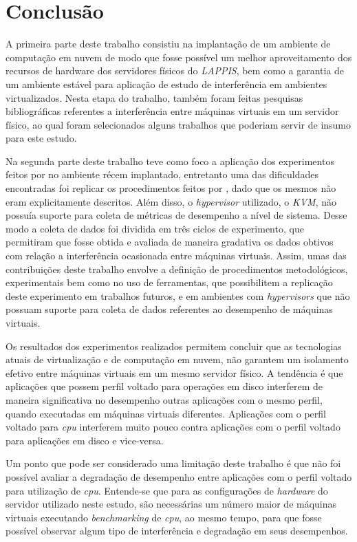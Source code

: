 \chapter{Conclusão}
\label{cap:conclusao}

A primeira parte deste trabalho consistiu na implantação de um ambiente de computação em nuvem de modo que fosse possível um melhor aproveitamento dos recursos de hardware dos servidores físicos do \textit{LAPPIS}, bem como a garantia de um ambiente estável para aplicação de estudo de interferência em ambientes virtualizados. Nesta etapa do trabalho, também foram feitas pesquisas bibliográficas referentes a interferência entre máquinas virtuais em um servidor físico, ao qual foram selecionados alguns trabalhos que poderiam servir de insumo para este estudo.

Na segunda parte deste trabalho teve como foco a aplicação dos experimentos feitos por  no ambiente récem implantado, entretanto uma das dificuldades encontradas foi replicar os procedimentos feitos por , dado que os mesmos não eram explicitamente descritos. Além disso, o \textit{hypervisor} utilizado, o \textit{KVM}, não possuía suporte para coleta de métricas de desempenho a nível de sistema. Desse modo a coleta de dados foi dividida em três ciclos de experimento, que permitiram que fosse obtida e avaliada de maneira gradativa os dados obtivos com relação a interferência ocasionada entre máquinas virtuais. Assim, umas das contribuições deste trabalho envolve a definição de procedimentos metodológicos, experimentais bem como no uso de ferramentas, que possibilitem a replicação deste experimento em trabalhos futuros, e em ambientes com \textit{hypervisors} que não possuam suporte para coleta de dados referentes ao desempenho de máquinas virtuais.  %

Os resultados dos experimentos realizados permitem concluir que as tecnologias atuais de virtualização e de computação em nuvem, não garantem um isolamento efetivo entre máquinas virtuais em um mesmo servidor físico. A tendência é que aplicações que possem perfil voltado para operações em disco interferem de maneira significativa no desempenho outras aplicações  com o mesmo perfil, quando executadas em máquinas virtuais diferentes. Aplicações com o perfil voltado para \textit{cpu} interferem muito pouco contra aplicações com o perfil voltado para aplicações em disco e vice-versa.

Um ponto que pode ser considerado uma limitação deste trabalho é que não foi possível avaliar a degradação de desempenho entre aplicações com o perfil voltado para utilização de \textit{cpu}. Entende-se que para as configurações de \textit{hardware} do servidor utilizado neste estudo, são necessárias um número maior de máquinas virtuais executando \textit{benchmarking} de \textit{cpu}, ao mesmo tempo, para que fosse possível observar algum tipo de interferência e degradação em seus desempenhos.

